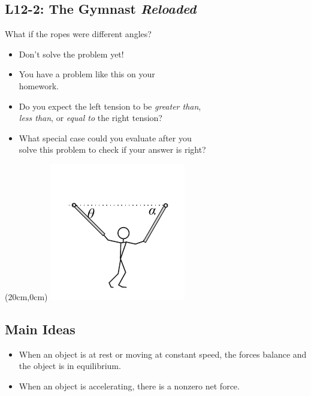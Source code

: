 \documentclass[]{article}
\newcommand{\Week}{12}
\begin{document}
\begin{PresentSpace}
\vspace{-10pt}
\section*{L\Week-2: The Gymnast \textit{Reloaded}}
\vspace{-10pt}
What if the ropes were different angles?
\begin{itemize}
	\item Don't solve the problem yet!
	\item You have a problem like this on your \\
	homework.
	\item Do you expect the left tension to be \textit{greater than}, \\
	\textit{less than}, or \textit{equal to} the right tension?
	\item What special case could you evaluate after you \\
	solve this problem to check if your answer is right?
\end{itemize}
\end{PresentSpace}
\begin{textblock*}{5cm}(20cm,0cm)
\centering
\includegraphics[scale=2]{Gymnast_Suspended_with_Unequal_Angles}
\end{textblock*}
\newpage
\begin{TeacherMargin}
	
\end{TeacherMargin}
\begin{PresentSpace}
\section*{Main Ideas}
\begin{itemize}
	\item When an object is at rest or moving at constant speed, the forces balance and the object is in equilibrium.
	\item When an object is accelerating, there is a nonzero net force.
\end{itemize}
\end{PresentSpace}
\end{document}
